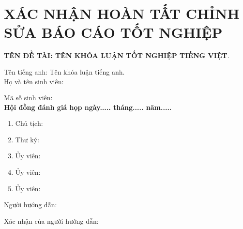 \chapter*{XÁC NHẬN HOÀN TẤT CHỈNH SỬA BÁO CÁO TỐT NGHIỆP}

{\textbf{TÊN ĐỀ TÀI: TÊN KHÓA LUẬN TỐT NGHIỆP TIẾNG VIỆT}.}

{Tên tiếng anh: Tên khóa luận tiếng anh.}\\[.1 cm]

Họ và tên sinh viên: \tenSV

Mã số sinh viên: \mssv \\[.1 cm]

\textbf{Hội đồng đánh giá họp ngày..... tháng..... năm.....}

\begin{enumerate}
	\item Chủ tịch: 
	\item Thư ký: 
	\item Ủy viên: 
	\item Ủy viên: 
	\item Ủy viên: 
\end{enumerate}

\vspace{.2 cm}
Người hướng dẫn: \tenGVHD

Xác nhận của người hướng dẫn: